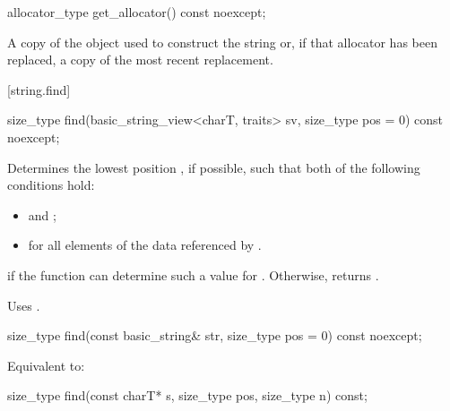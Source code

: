 %
\begin{itemdecl}
allocator_type get_allocator() const noexcept;
\end{itemdecl}

\begin{itemdescr}
\pnum
\returns
A copy of the
object used to construct the string or, if that allocator has been replaced, a
copy of the most recent replacement.
\end{itemdescr}

[string.find]{}

%
\begin{itemdecl}
size_type find(basic_string_view<charT, traits> sv, size_type pos = 0) const noexcept;
\end{itemdecl}

\begin{itemdescr}
\pnum
\effects
Determines the lowest position , if possible, such that both of
the following conditions hold:
\begin{itemize}
\item
{} and
;
\item
{}%
for all elements  of the data referenced by .
\end{itemize}

\pnum
\returns
{} if the function can determine such a value for .
Otherwise, returns
.

\pnum
\remarks
Uses
.
\end{itemdescr}

%
\begin{itemdecl}
size_type find(const basic_string& str, size_type pos = 0) const noexcept;
\end{itemdecl}

\begin{itemdescr}
\pnum
\effects
Equivalent to: 
\end{itemdescr}

%
\begin{itemdecl}
size_type find(const charT* s, size_type pos, size_type n) const;
\end{itemdecl}

